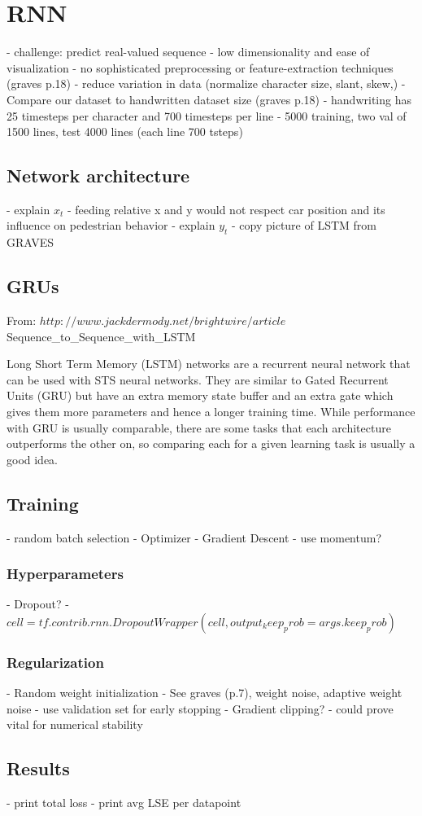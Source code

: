 \section{RNN} \label{sec:rnn}

- challenge: predict real-valued sequence
- low dimensionality and ease of visualization
- no sophisticated preprocessing or feature-extraction techniques (graves p.18)
	- reduce variation in data (normalize character size, slant, skew,)
- Compare our dataset to handwritten dataset size (graves p.18)
- handwriting has 25 timesteps per character and 700 timesteps per line
- 5000 training, two val of 1500 lines, test 4000 lines (each line 700 tsteps)

\subsection{Network architecture}
- explain $x_t$
	- feeding relative x and y would not respect car position and its influence on pedestrian behavior
- explain $y_t$
- copy picture of LSTM from GRAVES

\subsection{GRUs}
From: $http://www.jackdermody.net/brightwire/article$
Sequence_to_Sequence_with_LSTM

Long Short Term Memory (LSTM) networks are a recurrent neural network that can be used with STS neural networks. They are similar to Gated Recurrent Units (GRU) but have an extra memory state buffer and an extra gate which gives them more parameters and hence a longer training time. While performance with GRU is usually comparable, there are some tasks that each architecture outperforms the other on, so comparing each for a given learning task is usually a good idea.

\subsection{Training}
- random batch selection
- Optimizer
	- Gradient Descent
		- use momentum?

\subsubsection{Hyperparameters}
- Dropout?
	- $cell = tf.contrib.rnn.DropoutWrapper(cell, output_keep_prob = args.keep_prob)$

\subsubsection{Regularization}
- Random weight initialization
	- See graves (p.7), weight noise, adaptive weight noise
- use validation set for early stopping
- Gradient clipping?
	- could prove vital for numerical stability
	
\subsection{Results}
- print total loss
- print avg LSE per datapoint
